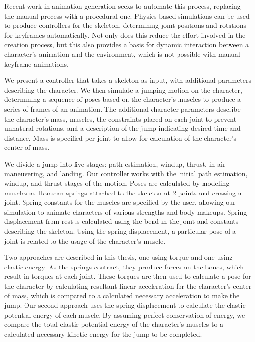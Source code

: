 Recent work in animation generation seeks to automate this process, replacing the manual process with a procedural one.  Physics based simulations can be used to produce controllers for the skeleton, determining joint positions and rotations for keyframes automatically.  Not only does this reduce the effort involved in the creation process, but this also provides a basis for dynamic interaction between a character's animation and the environment, which is not possible with manual keyframe animations.

We present a controller that takes a skeleton as input, with additional parameters describing the character.  We then simulate a jumping motion on the character, determining a sequence of poses based on the character's muscles to produce a series of frames of an animation.  The additional character parameters describe the character's mass, muscles, the constraints placed on each joint to prevent unnatural rotations, and a description of the jump indicating desired time and distance.  Mass is specified per-joint to allow for calculation of the character's center of mass.  

We divide a jump into five stages: path estimation, windup, thrust, in air maneuvering, and landing. Our controller works with the initial path estimation, windup, and thrust stages of the motion.  Poses are  calculated by modeling muscles as Hookean springs attached to the skeleton at 2 points and crossing a joint. Spring constants for the muscles are specified by the user, allowing our simulation to animate characters of various strengths and body makeups.  Spring displacement from rest is calculated using the bend in the joint and constants describing the skeleton.  Using the spring displacement, a particular pose of a joint is related to the usage of the character's muscle.

Two approaches are described in this thesis, one using torque and one using elastic energy.  As the springs contract, they produce forces on the bones, which result in torques at each joint.  These torques are then used to calculate a pose for the character by calculating resultant linear acceleration for the character's center of mass, which is compared to a calculated necessary acceleration to make the jump.  Our second approach uses the spring displacement to calculate the elastic potential energy of each muscle.  By assuming perfect conservation of energy, we compare the total elastic potential energy of the character's muscles to a calculated necessary kinetic energy for the jump to be completed.

